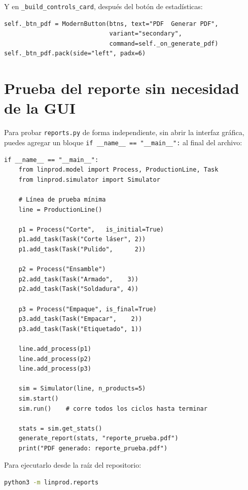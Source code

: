\documentclass[12pt,letterpaper]{article}
\begin{document}
Y en \texttt{\_build\_controls\_card}, después del botón de estadísticas:

\begin{lstlisting}
self._btn_pdf = ModernButton(btns, text="PDF  Generar PDF",
                             variant="secondary",
                             command=self._on_generate_pdf)
self._btn_pdf.pack(side="left", padx=6)
\end{lstlisting}

\section{Prueba del reporte sin necesidad de la GUI}

Para probar \texttt{reports.py} de forma independiente, sin abrir la interfaz
gráfica, puedes agregar un bloque \texttt{if \_\_name\_\_ == "\_\_main\_\_":}
al final del archivo:

\begin{lstlisting}
if __name__ == "__main__":
    from linprod.model import Process, ProductionLine, Task
    from linprod.simulator import Simulator

    # Línea de prueba mínima
    line = ProductionLine()

    p1 = Process("Corte",   is_initial=True)
    p1.add_task(Task("Corte láser", 2))
    p1.add_task(Task("Pulido",      2))

    p2 = Process("Ensamble")
    p2.add_task(Task("Armado",    3))
    p2.add_task(Task("Soldadura", 4))

    p3 = Process("Empaque", is_final=True)
    p3.add_task(Task("Empacar",    2))
    p3.add_task(Task("Etiquetado", 1))

    line.add_process(p1)
    line.add_process(p2)
    line.add_process(p3)

    sim = Simulator(line, n_products=5)
    sim.start()
    sim.run()    # corre todos los ciclos hasta terminar

    stats = sim.get_stats()
    generate_report(stats, "reporte_prueba.pdf")
    print("PDF generado: reporte_prueba.pdf")
\end{lstlisting}

Para ejecutarlo desde la raíz del repositorio:

\begin{lstlisting}[language=bash, numbers=none]
python3 -m linprod.reports
\end{lstlisting}
\end{document}
